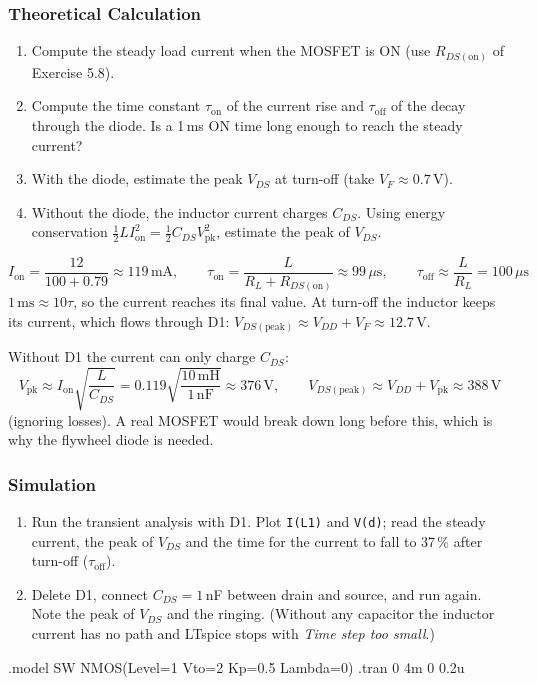 \subsubsection*{Theoretical Calculation}
\begin{enumerate}[itemsep=2pt]
  \item Compute the steady load current when the MOSFET is ON (use $R_{DS(\mathrm{on})}$ of Exercise 5.8).
  \item Compute the time constant $\tau_{\mathrm{on}}$ of the current rise and $\tau_{\mathrm{off}}$ of the decay through the diode.
        Is a 1\,ms ON time long enough to reach the steady current?
  \item With the diode, estimate the peak $V_{DS}$ at turn-off (take $V_F \approx 0.7$\,V).
  \item Without the diode, the inductor current charges $C_{DS}$. Using energy conservation
        $\tfrac12 L I_{\mathrm{on}}^2 = \tfrac12 C_{DS} V_{\mathrm{pk}}^2$, estimate the peak of $V_{DS}$.
\end{enumerate}
\begin{solution}
\[
  I_{\mathrm{on}} = \frac{12}{100+0.79} \approx 119\,\mathrm{mA},\qquad
  \tau_{\mathrm{on}} = \frac{L}{R_L+R_{DS(\mathrm{on})}} \approx 99\,\mu\mathrm{s},\qquad
  \tau_{\mathrm{off}} \approx \frac{L}{R_L} = 100\,\mu\mathrm{s}
\]
$1\,\mathrm{ms} \approx 10\tau$, so the current reaches its final value. At turn-off the inductor keeps its current, which
flows through D1: $V_{DS(\mathrm{peak})} \approx V_{DD} + V_F \approx 12.7$\,V.

Without D1 the current can only charge $C_{DS}$:
\[
  V_{\mathrm{pk}} \approx I_{\mathrm{on}}\sqrt{\frac{L}{C_{DS}}} = 0.119\sqrt{\frac{10\,\mathrm{mH}}{1\,\mathrm{nF}}} \approx 376\,\mathrm{V},
  \qquad V_{DS(\mathrm{peak})} \approx V_{DD} + V_{\mathrm{pk}} \approx 388\,\mathrm{V}
\]
(ignoring losses). A real MOSFET would break down long before this, which is why the flywheel diode is needed.
\end{solution}

\subsubsection*{Simulation}
\begin{enumerate}[itemsep=2pt]
  \item Run the transient analysis with D1. Plot \texttt{I(L1)} and \texttt{V(d)}; read the steady current, the peak of $V_{DS}$
        and the time for the current to fall to 37\,\% after turn-off ($\tau_{\mathrm{off}}$).
  \item Delete D1, connect $C_{DS} = 1$\,nF between drain and source, and run again. Note the peak of $V_{DS}$ and the ringing.
        (Without any capacitor the inductor current has no path and LTspice stops with \textit{Time step too small}.)
\end{enumerate}
\begin{spice}
.model SW NMOS(Level=1 Vto=2 Kp=0.5 Lambda=0)
.tran 0 4m 0 0.2u
\end{spice}

